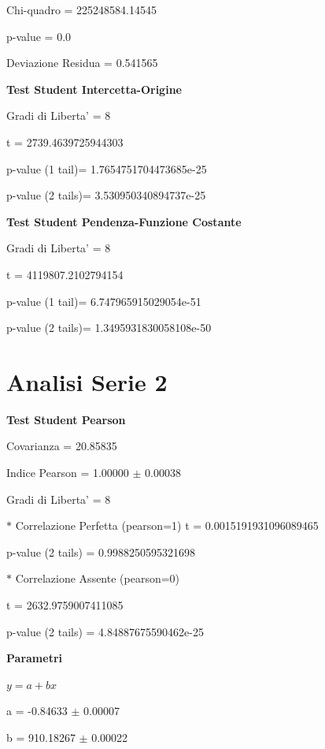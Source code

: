 \documentclass{article}
\begin{document}
Chi-quadro = 225248584.14545

p-value = 0.0

Deviazione Residua = 0.541565

\textbf{Test Student Intercetta-Origine}

Gradi di Liberta' = 8

t = 2739.4639725944303

p-value (1 tail)= 1.7654751704473685e-25

p-value (2 tails)= 3.530950340894737e-25

\textbf{Test Student Pendenza-Funzione Costante}

Gradi di Liberta' = 8

t = 4119807.2102794154

p-value (1 tail)= 6.747965915029054e-51

p-value (2 tails)= 1.3495931830058108e-50

\section*{Analisi Serie 2}

\textbf{Test Student Pearson}

Covarianza = 20.85835

Indice Pearson = 1.00000 $\pm$ 0.00038

Gradi di Liberta' = 8

$\ast$ Correlazione Perfetta (pearson=1)
t = 0.0015191931096089465

p-value (2 tails) = 0.9988250595321698

$\ast$ Correlazione Assente (pearson=0)

t = 2632.9759007411085

p-value (2 tails) = 4.84887675590462e-25

\textbf{Parametri}

$y = a + bx$

a = -0.84633 $\pm$ 0.00007

b = 910.18267 $\pm$ 0.00022
\end{document}
